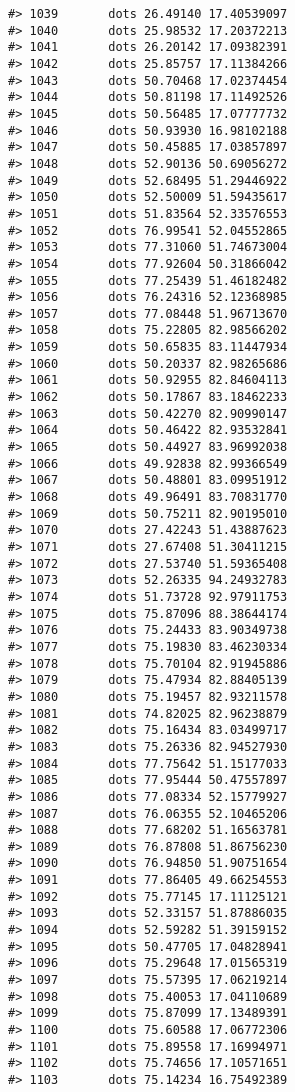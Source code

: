 \documentclass[
]{book}
\theoremstyle{definition}
\theoremstyle{definition}
\theoremstyle{definition}
\theoremstyle{definition}
\theoremstyle{remark}
\begin{document}
\begin{verbatim}
#> 1039       dots 26.49140 17.40539097
#> 1040       dots 25.98532 17.20372213
#> 1041       dots 26.20142 17.09382391
#> 1042       dots 25.85757 17.11384266
#> 1043       dots 50.70468 17.02374454
#> 1044       dots 50.81198 17.11492526
#> 1045       dots 50.56485 17.07777732
#> 1046       dots 50.93930 16.98102188
#> 1047       dots 50.45885 17.03857897
#> 1048       dots 52.90136 50.69056272
#> 1049       dots 52.68495 51.29446922
#> 1050       dots 52.50009 51.59435617
#> 1051       dots 51.83564 52.33576553
#> 1052       dots 76.99541 52.04552865
#> 1053       dots 77.31060 51.74673004
#> 1054       dots 77.92604 50.31866042
#> 1055       dots 77.25439 51.46182482
#> 1056       dots 76.24316 52.12368985
#> 1057       dots 77.08448 51.96713670
#> 1058       dots 75.22805 82.98566202
#> 1059       dots 50.65835 83.11447934
#> 1060       dots 50.20337 82.98265686
#> 1061       dots 50.92955 82.84604113
#> 1062       dots 50.17867 83.18462233
#> 1063       dots 50.42270 82.90990147
#> 1064       dots 50.46422 82.93532841
#> 1065       dots 50.44927 83.96992038
#> 1066       dots 49.92838 82.99366549
#> 1067       dots 50.48801 83.09951912
#> 1068       dots 49.96491 83.70831770
#> 1069       dots 50.75211 82.90195010
#> 1070       dots 27.42243 51.43887623
#> 1071       dots 27.67408 51.30411215
#> 1072       dots 27.53740 51.59365408
#> 1073       dots 52.26335 94.24932783
#> 1074       dots 51.73728 92.97911753
#> 1075       dots 75.87096 88.38644174
#> 1076       dots 75.24433 83.90349738
#> 1077       dots 75.19830 83.46230334
#> 1078       dots 75.70104 82.91945886
#> 1079       dots 75.47934 82.88405139
#> 1080       dots 75.19457 82.93211578
#> 1081       dots 74.82025 82.96238879
#> 1082       dots 75.16434 83.03499717
#> 1083       dots 75.26336 82.94527930
#> 1084       dots 77.75642 51.15177033
#> 1085       dots 77.95444 50.47557897
#> 1086       dots 77.08334 52.15779927
#> 1087       dots 76.06355 52.10465206
#> 1088       dots 77.68202 51.16563781
#> 1089       dots 76.87808 51.86756230
#> 1090       dots 76.94850 51.90751654
#> 1091       dots 77.86405 49.66254553
#> 1092       dots 75.77145 17.11125121
#> 1093       dots 52.33157 51.87886035
#> 1094       dots 52.59282 51.39159152
#> 1095       dots 50.47705 17.04828941
#> 1096       dots 75.29648 17.01565319
#> 1097       dots 75.57395 17.06219214
#> 1098       dots 75.40053 17.04110689
#> 1099       dots 75.87099 17.13489391
#> 1100       dots 75.60588 17.06772306
#> 1101       dots 75.89558 17.16994971
#> 1102       dots 75.74656 17.10571651
#> 1103       dots 75.14234 16.75492389

\end{verbatim}
\end{document}
